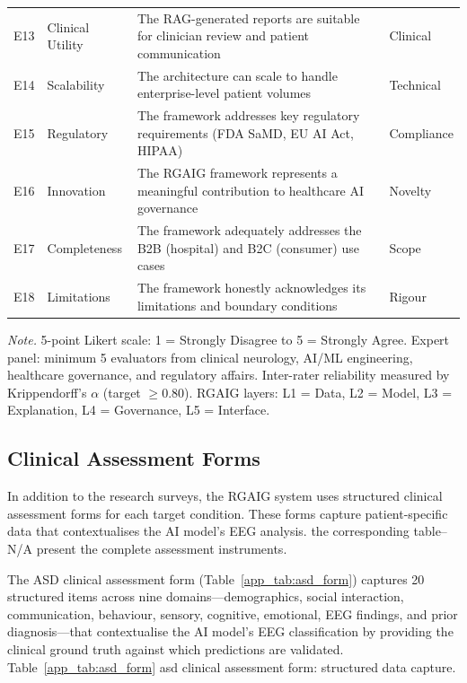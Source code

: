 {\begin{xltabular}{\textwidth}{@{} >{\raggedright\arraybackslash}p{0.5cm} >{\raggedright\arraybackslash}p{2.5cm} L p{1.5cm} @{}}
\addlinespace
E13 & Clinical Utility & The RAG-generated reports are suitable for clinician review and patient communication & Clinical \\
\addlinespace
E14 & Scalability & The architecture can scale to handle enterprise-level patient volumes & Technical \\
\addlinespace
E15 & Regulatory & The framework addresses key regulatory requirements (FDA SaMD, EU AI Act, HIPAA) & Compliance \\
\addlinespace
E16 & Innovation & The RGAIG framework represents a meaningful contribution to healthcare AI governance & Novelty \\
\addlinespace
E17 & Completeness & The framework adequately addresses the B2B (hospital) and B2C (consumer) use cases & Scope \\
\addlinespace
E18 & Limitations & The framework honestly acknowledges its limitations and boundary conditions & Rigour \\
\end{xltabular}}
\vspace{0.5em}\noindent\textit{Note.} 5-point Likert scale: 1 = Strongly Disagree to 5 = Strongly Agree. Expert panel: minimum 5 evaluators from clinical neurology, AI/ML engineering, healthcare governance, and regulatory affairs. Inter-rater reliability measured by Krippendorff's $\alpha$ (target $\geq$0.80). RGAIG layers: L1 = Data, L2 = Model, L3 = Explanation, L4 = Governance, L5 = Interface.

\subsection{Clinical Assessment Forms}
\label{app_sec:clinical_assessment_forms}

In addition to the research surveys, the RGAIG system uses structured clinical assessment forms for each target condition. These forms capture patient-specific data that contextualises the AI model's EEG analysis. the corresponding table--N/A present the complete assessment instruments.

\noindent The ASD clinical assessment form (Table~\ref{app_tab:asd_form}) captures 20 structured items across nine domains---demographics, social interaction, communication, behaviour, sensory, cognitive, emotional, EEG findings, and prior diagnosis---that contextualise the AI model's EEG classification by providing the clinical ground truth against which predictions are validated.
\noindent Table~\ref{app_tab:asd_form} asd clinical assessment form: structured data capture.

